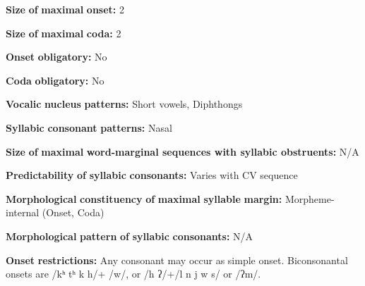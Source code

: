 \begin{styleBody}
\textbf{Size} \textbf{of} \textbf{maximal} \textbf{onset:} 2
\end{styleBody}

\begin{styleBody}
\textbf{Size} \textbf{of} \textbf{maximal} \textbf{coda:} 2
\end{styleBody}

\begin{styleBody}
\textbf{Onset} \textbf{obligatory:} No
\end{styleBody}

\begin{styleBody}
\textbf{Coda} \textbf{obligatory:} No
\end{styleBody}

\begin{styleBody}
\textbf{Vocalic} \textbf{nucleus} \textbf{patterns:} Short vowels, Diphthongs
\end{styleBody}

\begin{styleBody}
\textbf{Syllabic} \textbf{consonant} \textbf{patterns:} Nasal
\end{styleBody}

\begin{styleBody}
\textbf{Size} \textbf{of} \textbf{maximal} \textbf{word{}-marginal sequences with syllabic obstruents:} N/A
\end{styleBody}

\begin{styleBody}
\textbf{Predictability} \textbf{of} \textbf{syllabic} \textbf{consonants:} Varies with CV sequence
\end{styleBody}

\begin{styleBody}
\textbf{Morphological} \textbf{constituency} \textbf{of} \textbf{maximal} \textbf{syllable} \textbf{margin:} Morpheme-internal (Onset, Coda)
\end{styleBody}

\begin{styleBody}
\textbf{Morphological} \textbf{pattern} \textbf{of} \textbf{syllabic} \textbf{consonants:} N/A
\end{styleBody}

\begin{styleBody}
\textbf{Onset} \textbf{restrictions:} Any consonant may occur as simple onset. Biconsonantal onsets are /kʰ tʰ k h/+ /w/, or /h ʔ/+/l n j w s/ or /ʔm/.
\end{styleBody}

